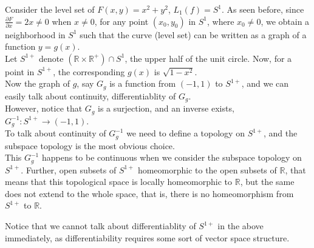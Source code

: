 \begin{observe}
    Consider the level set of $F(x,y)=x^2+y^2$, $L_{1}(f)=S^1$. As seen before, since $\frac{\partial F}{\partial x}=2x\neq 0$ when $x\neq 0$, for any point $(x_0,y_0)$ in $S^1$, where $x_0\neq0$, we obtain a neighborhood in $S^1$ such that the curve (level set) can be written as a graph of a function $y=g(x)$.\\
    Let $S^{1+}$ denote $(\mathbb{R}\times\mathbb{R}^{+})\cap S^{1}$, the upper half of the unit circle. Now, for a point in $S^{1+}$, the corresponding $g(x)$ is $\sqrt{1-x^2}$.\\
    Now the graph of $g$, say $G_{g}$ is a function from $(-1,1)$ to $S^{1+}$, and we can easily talk about continuity, differentiablity of $G_{g}$.\\
    However, notice that $G_{g}$ is a surjection, and an inverse exists, $G_{g}^{-1}:S^{1+}\to(-1,1)$.\\
    To talk about continuity of $G_{g}^{-1}$ we need to define a topology on $S^{1+}$, and the subspace topology is the most obvious choice.\\
    This $G_{g}^{-1}$ happens to be continuous when we consider the subspace topology on $S^{1+}$. Further, open subsets of $S^{1+}$ homeomorphic to the open subsets of $\mathbb{R}$, that means that this topological space is locally homeomorphic to $\mathbb{R}$, but the same does not extend to the whole space, that is, there is no homeomorphism from $S^{1+}$ to $\mathbb{R}$.
\end{observe}
\vspace{0.4cm}
\begin{note}
    Notice that we cannot talk about differentiablity of $S^{1+}$ in the above immediately, as differentiability requires some sort of vector space structure.
\end{note}

